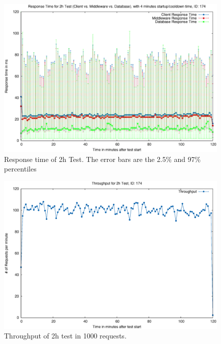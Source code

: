 \documentclass[milestone1.tex]{subfiles}
\begin{document}
\begin{figure}[H]
  \begin{center}
    \includegraphics[scale=0.6]{../exported_plots/2h/174_rt-final.eps}
  \end{center}
  \caption{Response time of 2h Test. The error bars are the 2.5\% and 97\% percentiles}
  \label{fig:2htest-plot-rt}
\end{figure}


\begin{figure}[H]
  \begin{center}
    \includegraphics[scale=0.6]{../exported_plots/2h/174_tp-final.eps}
  \end{center}
  \caption{Throughput of 2h test in 1000 requests.}
  \label{fig:2htest-plot-tp}
\end{figure}
\end{document}
